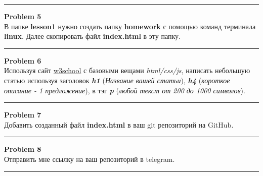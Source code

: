 \documentclass[a4paper, 11pt]{extarticle}
\newenvironment{problem}[2][Problem]
    { \begin{mdframed}[backgroundcolor=gray!20] \textbf{#1 #2} \\}
    {  \end{mdframed}}
\newenvironment{solution}
    {\textit{Solution:}}
    {}
\begin{document}
\noindent\rule{6.257in}{2.8pt}



\begin{problem}{5}
В папке \textbf{lesson1} нужно создать папку \textbf{homework} с помощью команд терминала \textbf{linux}. Далее скопировать файл \textbf{index.html} в эту папку.
\end{problem}

\noindent\rule{6.257in}{2.8pt}



\begin{problem}{6}
Используя сайт \href{https://www.w3schools.com/html/default.asp}{w3school} с базовыми вещами \textit{html/css/js}, написать небольшую статью используя заголовок \textit{\textbf{h1}} (\textit{Название вашей статьи}), \textit{\textbf{h4}} (\textit{короткое описание - 1 предложение}), в тэг \textit{\textbf{p}} (\textit{любой текст от 200 до 1000 символов}). 
\end{problem}
\noindent\rule{6.257in}{2.8pt}



\begin{problem}{7}
Добавить созданный файл \textbf{index.html} в ваш git репозиторий на GitHub.
\end{problem}
\noindent\rule{6.257in}{2.8pt}



\begin{problem}{8}
Отправить мне ссылку на ваш репозиторий в telegram.
\end{problem}

\noindent\rule{6.257in}{2.8pt}
\end{document}
